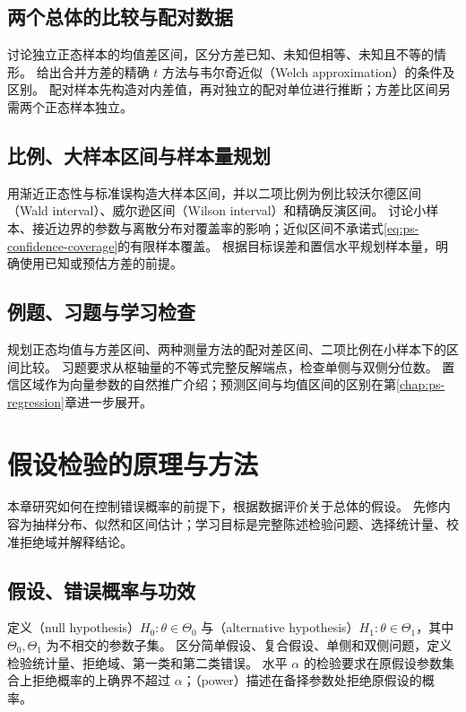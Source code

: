 \documentclass[UTF8,12pt,a4paper,fontset=fandol]{ctexbook}
\begin{document}
\section{两个总体的比较与配对数据}
\label{sec:ps-two-sample-intervals}
讨论独立正态样本的均值差区间，区分方差已知、未知但相等、未知且不等的情形。
给出合并方差的精确 $t$ 方法与韦尔奇近似（Welch approximation）的条件及区别。
配对样本先构造对内差值，再对独立的配对单位进行推断；方差比区间另需两个正态样本独立。

\section{比例、大样本区间与样本量规划}
\label{sec:ps-asymptotic-intervals}
用渐近正态性与标准误构造大样本区间，并以二项比例为例比较沃尔德区间（Wald interval）、威尔逊区间（Wilson interval）和精确反演区间。
讨论小样本、接近边界的参数与离散分布对覆盖率的影响；近似区间不承诺式\eqref{eq:ps-confidence-coverage}的有限样本覆盖。
根据目标误差和置信水平规划样本量，明确使用已知或预估方差的前提。

\section{例题、习题与学习检查}
规划正态均值与方差区间、两种测量方法的配对差区间、二项比例在小样本下的区间比较。
习题要求从枢轴量的不等式完整反解端点，检查单侧与双侧分位数。
置信区域作为向量参数的自然推广介绍；预测区间与均值区间的区别在第\ref{chap:ps-regression}章进一步展开。


\chapter{假设检验的原理与方法}
\label{chap:ps-testing}

本章研究如何在控制错误概率的前提下，根据数据评价关于总体的假设。
先修内容为抽样分布、似然和区间估计；学习目标是完整陈述检验问题、选择统计量、校准拒绝域并解释结论。

\section{假设、错误概率与功效}
\label{sec:ps-testing-framework}
定义（null hypothesis）$H_0:\theta\in\Theta_0$ 与（alternative hypothesis）$H_1:\theta\in\Theta_1$，其中 $\Theta_0,\Theta_1$ 为不相交的参数子集。
区分简单假设、复合假设、单侧和双侧问题，定义检验统计量、拒绝域、第一类和第二类错误。
水平 $\alpha$ 的检验要求在原假设参数集合上拒绝概率的上确界不超过 $\alpha$；（power）描述在备择参数处拒绝原假设的概率。
\end{document}

